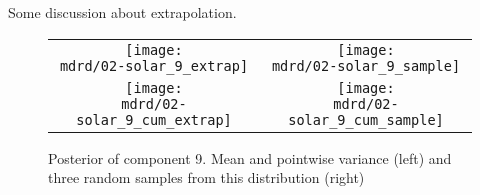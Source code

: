 \documentclass{article} %
\begin{document}
Some discussion about extrapolation.

\begin{figure}[H]
\newcommand{\wmgd}{0.5\columnwidth}
\newcommand{\hmgd}{3.0cm}
\newcommand{\mdrd}{figures/02-solar}
\newcommand{\mbm}{\hspace{-0.3cm}}
\begin{tabular}{cc}
\mbm \texttt{[image: \\mdrd/02-solar\_9\_extrap]} & \texttt{[image: \\mdrd/02-solar\_9\_sample]} \\
\mbm \texttt{[image: \\mdrd/02-solar\_9\_cum\_extrap]} & \texttt{[image: \\mdrd/02-solar\_9\_cum\_sample]}
\end{tabular}
\caption{Posterior of component 9. Mean and pointwise variance (left) and three random samples from this distribution (right)}
\label{fig:extrap9}
\end{figure}
\end{document}
